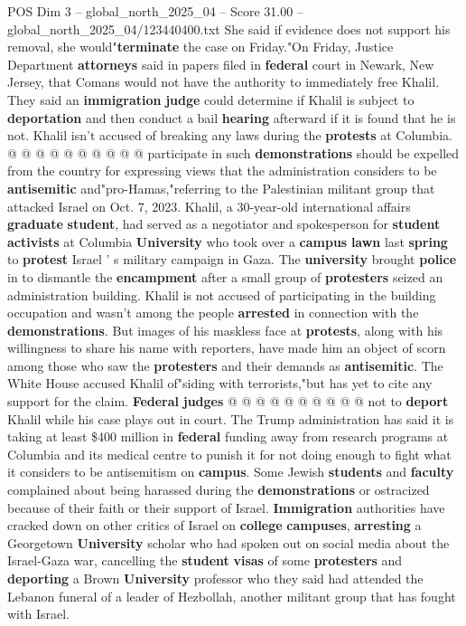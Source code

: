 \begin{textsample}{POS Dim 3 – global\_north\_2025\_04 – Score 31.00 – global\_north\_2025\_04/123440400.txt}
She said if evidence does not support his removal, she would"\textbf{terminate} the case on Friday."On Friday, Justice Department \textbf{attorneys} said in papers filed in \textbf{federal} court in Newark, New Jersey, that Comans would not have the authority to immediately free Khalil.
They said an \textbf{immigration} \textbf{judge} could determine if Khalil is subject to \textbf{deportation} and then conduct a bail \textbf{hearing} afterward if it is found that he is not.
Khalil isn't accused of breaking any laws during the \textbf{protests} at Columbia. @ @ @ @ @ @ @ @ @ @ participate in such \textbf{demonstrations} should be expelled from the country for expressing views that the administration considers to be \textbf{antisemitic} and"pro-Hamas,"referring to the Palestinian militant group that attacked Israel on Oct. 7, 2023.
Khalil, a 30-year-old international affairs \textbf{graduate} \textbf{student}, had served as a negotiator and spokesperson for \textbf{student} \textbf{activists} at Columbia \textbf{University} who took over a \textbf{campus} \textbf{lawn} last \textbf{spring} to \textbf{protest} Israel ' s military campaign in Gaza.
The \textbf{university} brought \textbf{police} in to dismantle the \textbf{encampment} after a small group of \textbf{protesters} seized an administration building.
Khalil is not accused of participating in the building occupation and wasn't among the people \textbf{arrested} in connection with the \textbf{demonstrations}.
But images of his maskless face at \textbf{protests}, along with his willingness to share his name with reporters, have made him an object of scorn among those who saw the \textbf{protesters} and their demands as \textbf{antisemitic}.
The White House accused Khalil of"siding with terrorists,"but has yet to cite any support for the claim. \textbf{Federal} \textbf{judges} @ @ @ @ @ @ @ @ @ @ not to \textbf{deport} Khalil while his case plays out in court.
The Trump administration has said it is taking at least \$400 million in \textbf{federal} funding away from research programs at Columbia and its medical centre to punish it for not doing enough to fight what it considers to be antisemitism on \textbf{campus}.
Some Jewish \textbf{students} and \textbf{faculty} complained about being harassed during the \textbf{demonstrations} or ostracized because of their faith or their support of Israel. \textbf{Immigration} authorities have cracked down on other critics of Israel on \textbf{college} \textbf{campuses}, \textbf{arresting} a Georgetown \textbf{University} scholar who had spoken out on social media about the Israel-Gaza war, cancelling the \textbf{student} \textbf{visas} of some \textbf{protesters} and \textbf{deporting} a Brown \textbf{University} professor who they said had attended the Lebanon funeral of a leader of Hezbollah, another militant group that has fought with Israel.


\end{textsample}
